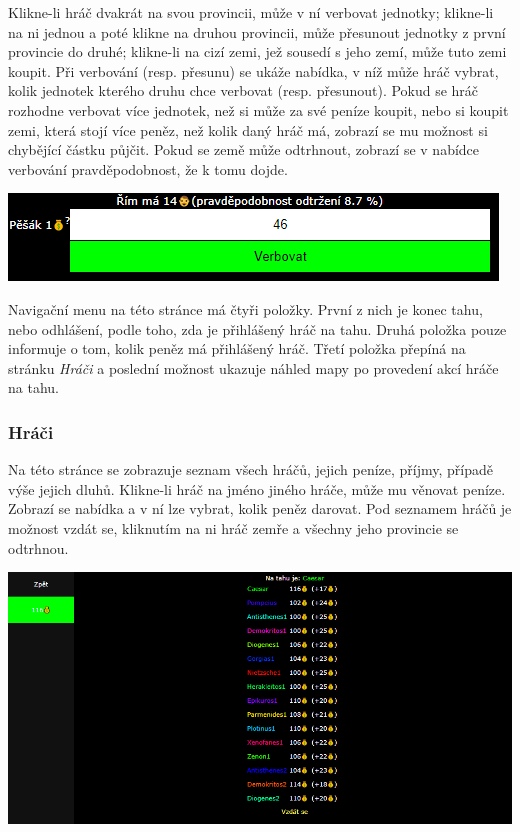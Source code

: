 \documentclass[a4paper,12pt]{article}
\begin{document}
Klikne-li hráč dvakrát na svou provincii, může v ní verbovat jednotky; klikne-li na ni jednou a poté klikne na druhou provincii, může přesunout jednotky z první provincie do druhé; klikne-li na cizí zemi, jež sousedí s jeho zemí, může tuto zemi koupit. Při verbování (resp. přesunu) se ukáže nabídka, v níž může hráč vybrat, kolik jednotek kterého druhu chce verbovat (resp. přesunout). Pokud se hráč rozhodne verbovat více jednotek, než si může za své peníze koupit, nebo si koupit zemi, která stojí více peněz, než kolik daný hráč má, zobrazí se mu možnost si chybějící částku půjčit. Pokud se země může odtrhnout, zobrazí se v nabídce verbování pravděpodobnost, že k tomu dojde.

\includegraphics[width=\textwidth]{Recruit.png}

Navigační menu na této stránce má čtyři položky. První z nich je konec tahu, nebo odhlášení, podle toho, zda je přihlášený hráč na tahu. Druhá položka pouze informuje o tom, kolik peněz má přihlášený hráč. Třetí položka přepíná na stránku \textit{Hráči} a poslední možnost ukazuje náhled mapy po provedení akcí hráče na tahu.
\subsubsection{Hráči}
Na této stránce se zobrazuje seznam všech hráčů, jejich peníze, příjmy, případě výše jejich dluhů. Klikne-li hráč na jméno jiného hráče, může mu věnovat peníze. Zobrazí se nabídka a v ní lze vybrat, kolik peněz darovat. Pod seznamem hráčů je možnost vzdát se, kliknutím na ni hráč zemře a všechny jeho provincie se odtrhnou.

\includegraphics[width=\textwidth]{Players.png}
\end{document}
